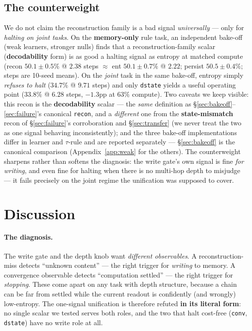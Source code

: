 \documentclass{article}
\newcommand{\sig}[1]{\texttt{#1}}
\begin{document}
\subsection{The counterweight}\label{sec:counterweight}

We do not claim the reconstruction family is a bad signal \emph{universally}
--- only for \emph{halting on joint tasks}. On the \textbf{memory-only} rule
task, an independent bake-off (weak learners, stronger nulls) finds that a
reconstruction-family scalar (\textbf{decodability} form) is as good a halting
signal as entropy at matched compute (recon $50.1\pm0.5\%$ @ $2.38$ steps
$\approx$ ent $50.1\pm0.7\%$ @ $2.22$; persist $50.5\pm0.4\%$; steps are
10-seed means). On the \emph{joint} task in the same bake-off, entropy simply
\emph{refuses to halt} ($34.7\%$ @ $9.71$ steps) and only \sig{dstate} yields a
useful operating point ($33.8\%$ @ $6.28$ steps, $-1.3$pp at $63\%$ compute).
Two caveats we keep visible: this recon is the \textbf{decodability} scalar ---
the \emph{same} definition as \S\ref{sec:bakeoff}--\ref{sec:failure}'s
canonical \sig{recon}, and a \emph{different} one from the
\textbf{state-mismatch} recon of \S\ref{sec:failure}'s corroboration and
\S\ref{sec:transfer} (we never treat the two as one signal behaving
inconsistently); and the three bake-off implementations differ in learner and
$\tau$-rule and are reported separately --- \S\ref{sec:bakeoff} is the
canonical comparison (Appendix~\ref{app:weak} for the others). The
counterweight sharpens rather than softens the diagnosis: the write gate's own
signal is fine \emph{for writing}, and even fine for halting when there is no
multi-hop depth to misjudge --- it fails precisely on the joint regime the
unification was supposed to cover.

\section{Discussion}

\paragraph{The diagnosis.} The write gate and the depth knob want
\emph{different observables}. A reconstruction-miss detects ``unknown
content'' --- the right trigger for \emph{writing} to memory. A convergence
observable detects ``computation settled'' --- the right trigger for
\emph{stopping}. These come apart on any task with depth structure, because a
chain can be far from settled while the current readout is confidently (and
wrongly) low-entropy. The one-signal unification is therefore refuted \textbf{in
its literal form}: no single scalar we tested serves both roles, and the two
that halt cost-free (\sig{conv}, \sig{dstate}) have no write role at all.
\end{document}
